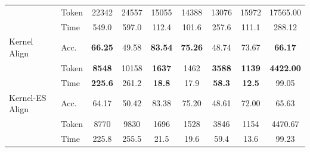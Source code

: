 \documentclass{article} %
\begin{document}
\begin{table}[t]
{{\begin{tabular}{@{}ll*{7}{c}@{}}
 & Token & 22342 & 24557 & 15055 & 14388 & 13076 & 15972 & 17565.00 \\
 & Time & 549.0 & 597.0 & 112.4 & 101.6 & 257.6 & 111.1 & 288.12 \\
\midrule
Kernel Align & Acc. & \textbf{66.25} & 49.58 & \textbf{83.54} & \textbf{75.26} & 48.74 & 73.67 & \textbf{66.17} \\
 & Token & \textbf{8548} & 10158 & \textbf{1637} & 1462 & \textbf{3588} & \textbf{1139} & \textbf{4422.00} \\
 & Time & \textbf{225.6} & 261.2 & \textbf{18.8} & 17.9 & \textbf{58.3} & \textbf{12.5} & 99.05 \\
\midrule
Kernel-ES Align & Acc. & 64.17 & 50.42 & 83.38 & 75.20 & 48.61 & 72.00 & 65.63 \\
 & Token & 8770 & 9830 & 1696 & 1528 & 3846 & 1154 & 4470.67 \\
 & Time & 225.8 & 255.5 & 21.5 & 19.6 & 59.4 & 13.6 & 99.23 \\
\bottomrule
\end{tabular}%
}%
}
\end{table}
\end{document}
